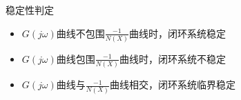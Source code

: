 \begin{frame}
\begin{block}{稳定性判定}
\begin{itemize}
\item $G(j\omega)$曲线不包围$\frac{-1}{N(X)}$曲线时，闭环系统稳定
\item $G(j\omega)$曲线包围$\frac{-1}{N(X)}$曲线时，闭环系统不稳定
\item $G(j\omega)$曲线与$\frac{-1}{N(X)}$曲线相交，闭环系统临界稳定
\end{itemize}
\end{block}
\end{frame}
